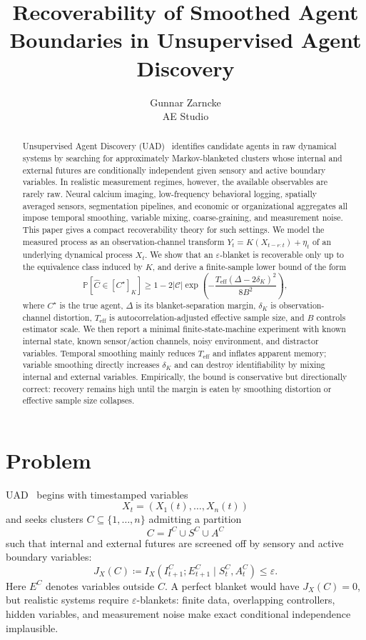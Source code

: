 \documentclass[10pt]{article}
\title{\vspace{-1.5em}Recoverability of Smoothed Agent Boundaries in Unsupervised Agent Discovery}
\author{Gunnar Zarncke\\AE Studio}
\date{\vspace{-0.8em}}
\newcommand{\MI}{I}
\newcommand{\Prob}{\mathbb{P}}
\newcommand{\cC}{\mathcal{C}}
\newcommand{\eff}{\mathrm{eff}}
\begin{document}
\maketitle

\begin{abstract}
Unsupervised Agent Discovery (UAD)~\cite{uad2025} identifies candidate agents in raw dynamical systems by searching for approximately Markov-blanketed clusters whose internal and external futures are conditionally independent given sensory and active boundary variables. In realistic measurement regimes, however, the available observables are rarely raw. Neural calcium imaging, low-frequency behavioral logging, spatially averaged sensors, segmentation pipelines, and economic or organizational aggregates all impose temporal smoothing, variable mixing, coarse-graining, and measurement noise. This paper gives a compact recoverability theory for such settings. We model the measured process as an observation-channel transform \(Y_t=K(X_{t-r:t})+\eta_t\) of an underlying dynamical process \(X_t\). We show that an \(\varepsilon\)-blanket is recoverable only up to the equivalence class induced by \(K\), and derive a finite-sample lower bound of the form
\[
\Prob[\hat C\in[C^\star]_K]
\ge
1-
2|\cC|
\exp\!\left(
-\frac{T_{\eff}(\Delta-2\delta_K)^2}{8B^2}
\right),
\]
where \(C^\star\) is the true agent, \(\Delta\) is its blanket-separation margin, \(\delta_K\) is observation-channel distortion, \(T_{\eff}\) is autocorrelation-adjusted effective sample size, and \(B\) controls estimator scale. We then report a minimal finite-state-machine experiment with known internal state, known sensor/action channels, noisy environment, and distractor variables. Temporal smoothing mainly reduces \(T_{\eff}\) and inflates apparent memory; variable smoothing directly increases \(\delta_K\) and can destroy identifiability by mixing internal and external variables. Empirically, the bound is conservative but directionally correct: recovery remains high until the margin is eaten by smoothing distortion or effective sample size collapses.
\end{abstract}

\section{Problem}

UAD~\cite{uad2025} begins with timestamped variables
\[
X_t=(X_1(t),\ldots,X_n(t))
\]
and seeks clusters \(C\subseteq\{1,\ldots,n\}\) admitting a partition
\[
C=I^C\cup S^C\cup A^C
\]
such that internal and external futures are screened off by sensory and active boundary variables:
\begin{equation}
J_X(C)
\coloneqq
\MI_X(I^C_{t+1};E^C_{t+1}\mid S^C_t,A^C_t)
\le \varepsilon.
\label{eq:uad_score}
\end{equation}
Here \(E^C\) denotes variables outside \(C\). A perfect blanket would have \(J_X(C)=0\), but realistic systems require \(\varepsilon\)-blankets: finite data, overlapping controllers, hidden variables, and measurement noise make exact conditional independence implausible.
\end{document}
